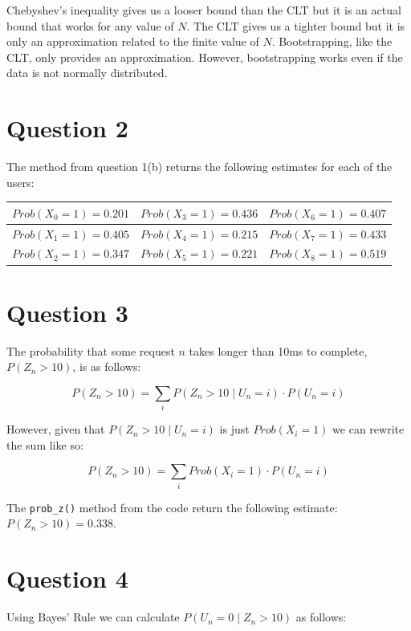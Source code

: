 \documentclass[12pt]{article}
\begin{document}
\indent Chebyshev's inequality gives us a looser bound than the CLT but it is an actual bound that works for any value of $N$. The CLT gives us a tighter bound but it is only an approximation related to the finite value of $N$. Bootstrapping, like the CLT, only provides an approximation. However, bootstrapping works even if the data is not normally distributed.

\section*{Question 2}

\noindent The method from question 1(b) returns the following estimates for each of the users:

\begin{center}
    \begin{tabular}{|c|c|c|}
        \hline
        $Prob(X_0 = 1) = 0.201$ & $Prob(X_3 = 1) = 0.436$ & $Prob(X_6 = 1) = 0.407$ \\ \hline
        $Prob(X_1 = 1) = 0.405$ & $Prob(X_4 = 1) = 0.215$ & $Prob(X_7 = 1) = 0.433$ \\ \hline
        $Prob(X_2 = 1) = 0.347$ & $Prob(X_5 = 1) = 0.221$ & $Prob(X_8 = 1) = 0.519$ \\ \hline
    \end{tabular}
\end{center}

\section*{Question 3}

\noindent The probability that some request $n$ takes longer than 10ms to complete, $P(Z_n > 10)$, is as follows:

$$P(Z_n > 10) = \sum_i P(Z_n > 10 \mid U_n = i) \cdot P(U_n = i)$$

\indent However, given that $P(Z_n > 10 \mid U_n = i)$ is just $Prob(X_i = 1)$ we can rewrite the sum like so:

$$P(Z_n > 10) = \sum_i Prob(X_i = 1) \cdot P(U_n = i)$$

\indent The \texttt{prob\_z()} method from the code return the following estimate: $P(Z_n > 10) = 0.338$.

\section*{Question 4}

\noindent Using Bayes' Rule we can calculate $P(U_n = 0 \mid Z_n > 10)$ as follows:
\end{document}
